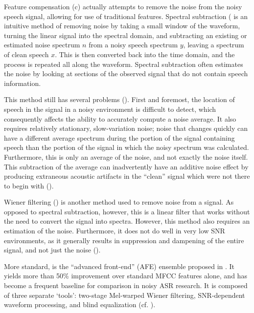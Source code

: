 \documentclass[dissertation,copyright]{uathesis}
\begin{document}
Feature compensation (c) actually attempts to remove the noise from the noisy speech signal, allowing for use of traditional features. Spectral subtraction (\cite{boll:79} is an intuitive method of removing noise by taking a small window of the waveform, turning the linear signal into the spectral domain, and subtracting an existing or estimated noise spectrum $n$ from a noisy speech spectrum $y$, leaving a spectrum of clean speech $x$.  This is then converted back into the time domain, and the process is repeated all along the waveform.  Spectral subtraction often estimates the noise by looking at sections of the observed signal that do not contain speech information.  

This method still has several problems (\cite{li:14}). First and foremost, the location of speech in the signal in a noisy environment is difficult to detect, which consequently affects the ability to accurately compute a noise average. It also requires relatively stationary, slow-variation noise; noise that changes quickly can have a different average spectrum during the portion of the signal containing speech than the portion of the signal in which the noisy spectrum was calculated.  Furthermore, this is only an average of the noise, and not exactly the noise itself.  This subtraction of the average can inadvertently have an additive noise effect by producing extraneous acoustic artifacts in the ``clean'' signal which were not there to begin with (\cite{berouti:79}).

Wiener filtering (\cite{lim:79}) is another method used to remove noise from a signal.  As opposed to spectral subtraction, however, this is a linear filter that works without the need to convert the signal into spectra.  However, this method also requires an estimation of the noise.  Furthermore, it does not do well in very low SNR environments, as it generally results in suppression and dampening of the entire signal, and not just the noise (\cite{li:14}).

More standard, is the ``advanced front-end'' (AFE) ensemble proposed in \cite{etsi:02}.  It yields more than 50\% improvement over standard MFCC features alone, and has become a frequent baseline for comparison in noisy ASR research.  It is composed of three separate `tools': two-stage Mel-warped Wiener filtering, SNR-dependent waveform processing, and blind equalization (cf. \cite{agarwal:99,macho:02,macho:01,mauuary:98}).
\end{document}
